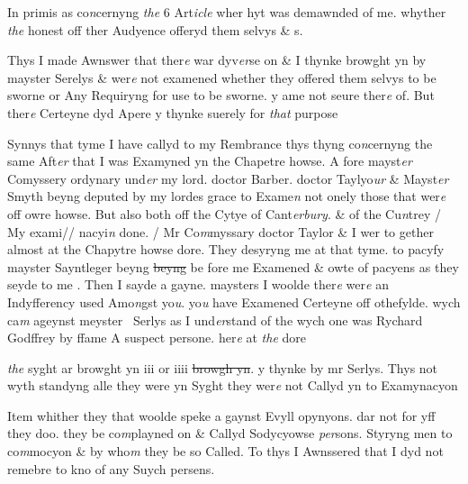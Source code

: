 \documentclass[12pt, a4paper]{book}
\begin{document}
		\ifthenelse{\isodd{\thepage}}
		{\reversemarginpar}
		{\normalmarginpar}
		In primis as co\textit{n}cernyng \textit{the} 6 Art\textit{icle} wher hyt was 
			demawnded of me. whyther \textit{the} honest off
ther Audyence offeryd them selvys \& s. 
	
		\ifthenelse{\isodd{\thepage}}
		{\reversemarginpar}
		{\normalmarginpar}
		Thys I made Awnswer that ther\textit{e} war dyv\textit{er}se on \& I thynke browght yn by mayster
Serelys \& wer\textit{e} not examened whether they offered them selvys to be sworne or
Any Requiryng for use to be sworne. y ame not seure ther\textit{e} of. But ther\textit{e} Certeyne
dyd Apere y thynke suerely for \textit{that} purpose 
	
		\ifthenelse{\isodd{\thepage}}
		{\reversemarginpar}
		{\normalmarginpar}
		Synnys that tyme I have callyd to my Rembrance thys thyng co\textit{n}cernyng the same
Aft\textit{er} that I was Examyned yn the Chapetre howse. A fore mayst\textit{er} Comyssery
ordynary und\textit{er} my lord. doctor Barber. doctor Taylyo\textit{ur} \& Mayst\textit{er} Smyth
beyng deputed by my lordes grace  to Exame\textit{n} not onely those that wer\textit{e} off
owre howse. But also both off the Cytye of Cant\textit{erbury}. \& of the Cu\textit{n}trey / My exami// 
nacyi\textit{n} done. / Mr Co\textit{m}myssary doctor Taylor \& I wer to gether almost at the 
Chapytre howse dore. They desyryng me at that tyme. to pacyfy mayster
Sayntleger 
			beyng \sout{beyng }be fore me Examened \& owte of pacyens as they seyde to me
			. Then
I sayde a gayne. maysters I woolde ther\textit{e} wer\textit{e} an Indyfferency used Amo\textit{n}gst
yo\textit{u}. yo\textit{u} have Examened Certeyne off othefylde. wych ca\textit{m} ageynst meyster 
Serlys as I und\textit{er}stand of the wych one was Rychard Godffrey by ffame
A suspect persone. her\textit{e} at \textit{the} dore \textit{}
               
                  \textit{the} syght 
			ar browght yn iii or iiii \sout{browgh yn}. y thynke
by mr Serlys. Thys not wyth standyng alle they were yn Syght they wer\textit{e}
not Callyd yn to Examynacyon


		\ifthenelse{\isodd{\thepage}}
		{\reversemarginpar}
		{\normalmarginpar}
		Item whither they that woolde speke a gaynst Evyll opynyons. dar not for
yff they doo. they be co\textit{m}playned on \& Callyd Sodycyowse \textit{per}sons. Styryng
men to co\textit{m}mocyon \& by who\textit{m} they be so Called. 
To thys I Awnssered that I dyd not remebre
			 to kno of any Suych persens.
            		
\end{document}
